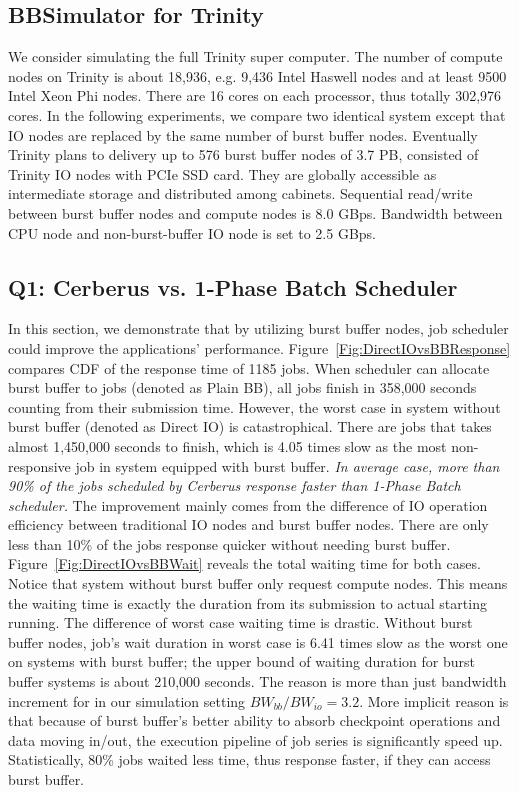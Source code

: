 \subsection{BBSimulator for Trinity}
We consider simulating the full Trinity super computer\cite{TrinitySystem}.
The number of compute nodes on Trinity is about 18,936,
e.g. 9,436 Intel Haswell nodes
and at least 9500 Intel Xeon Phi nodes.
There are 16 cores on each processor, thus totally 302,976 cores.
In the following experiments, we compare two identical system except that
IO nodes are replaced by the same number of burst buffer nodes.
Eventually Trinity plans to delivery up to 576 burst buffer nodes of 3.7 PB,
consisted of Trinity IO nodes with PCIe SSD card.
They are globally accessible as intermediate storage and distributed among cabinets.
Sequential read/write between burst buffer nodes and compute nodes is 8.0 GBps.
Bandwidth between CPU node and non-burst-buffer IO node is set to 2.5 GBps.


\subsection{Q1: Cerberus vs. 1-Phase Batch Scheduler}
\label{Sec:Sim:DirectIOvsBB}
In this section, we demonstrate that by utilizing burst buffer nodes,
job scheduler could improve the applications' performance.
Figure~\ref{Fig:DirectIOvsBBResponse} compares CDF of the response time of 1185 jobs.
When scheduler can allocate burst buffer to jobs (denoted as Plain BB),
all jobs finish in 358,000 seconds counting from their submission time.
However, the worst case in system without burst buffer
(denoted as Direct IO) is catastrophical.
There are jobs that takes almost 1,450,000 seconds to finish,
which is 4.05 times slow as the most non-responsive job
in system equipped with burst buffer.
\textit{In average case, more than 90\% of the jobs scheduled by Cerberus
response faster than 1-Phase Batch scheduler.}
The improvement mainly comes from the difference of IO operation efficiency between
traditional IO nodes and burst buffer nodes.
There are only less than 10\% of the jobs response quicker without needing burst buffer.
Figure~\ref{Fig:DirectIOvsBBWait} reveals the total waiting time for both cases.
Notice that system without burst buffer only request compute nodes.
This means the waiting time is exactly the duration
from its submission to actual starting running.
The difference of worst case waiting time is drastic.
Without burst buffer nodes, job's wait duration in worst case is 6.41 times
slow as the worst one on systems with burst buffer;
the upper bound of waiting duration for burst buffer systems is about 210,000 seconds.
The reason is more than just bandwidth increment
for in our simulation setting $BW_{bb} / BW_{io}=3.2$.
More implicit reason is that because of burst buffer's better ability to
absorb checkpoint operations and data moving in/out,
the execution pipeline of job series is significantly speed up.
Statistically, 80\% jobs waited less time, thus response faster,
if they can access burst buffer.


